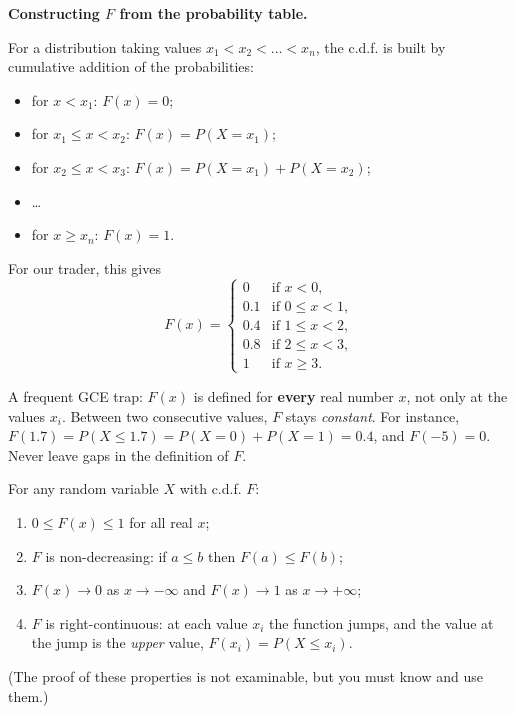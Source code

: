 \documentclass[11pt]{article}
\newcommand{\cle}[1]{{\popxbold\color{popdark}#1}}
\begin{document}
\textbf{Constructing $F$ from the probability table.}\par
For a distribution taking values $x_1 < x_2 < \dots < x_n$, the c.d.f. is built by \cle{cumulative addition} of the probabilities:
\begin{itemize}
\item for $x < x_1$: $F(x) = 0$;
\item for $x_1 \le x < x_2$: $F(x) = P(X=x_1)$;
\item for $x_2 \le x < x_3$: $F(x) = P(X=x_1)+P(X=x_2)$;
\item \dots
\item for $x \ge x_n$: $F(x) = 1$.
\end{itemize}
For our trader, this gives
\[ F(x) = \begin{cases} 0 & \text{if } x < 0,\\ 0.1 & \text{if } 0 \le x < 1,\\ 0.4 & \text{if } 1 \le x < 2,\\ 0.8 & \text{if } 2 \le x < 3,\\ 1 & \text{if } x \ge 3. \end{cases} \]

\begin{attention}
A frequent GCE trap: $F(x)$ is defined for \textbf{every} real number $x$, not only at the values $x_i$. Between two consecutive values, $F$ stays \emph{constant}. For instance, $F(1.7) = P(X \le 1.7) = P(X=0)+P(X=1) = 0.4$, and $F(-5) = 0$. Never leave gaps in the definition of $F$.
\end{attention}

\begin{propriete}
For any random variable $X$ with c.d.f. $F$:
\begin{enumerate}
\item $0 \le F(x) \le 1$ for all real $x$;
\item $F$ is \cle{non-decreasing}: if $a \le b$ then $F(a) \le F(b)$;
\item $F(x) \to 0$ as $x \to -\infty$ and $F(x) \to 1$ as $x \to +\infty$;
\item $F$ is \cle{right-continuous}: at each value $x_i$ the function jumps, and the value at the jump is the \emph{upper} value, $F(x_i) = P(X \le x_i)$.
\end{enumerate}
(The proof of these properties is not examinable, but you must know and use them.)
\end{propriete}
\end{document}
